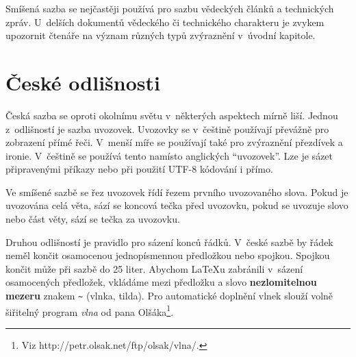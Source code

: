 \documentclass[a4paper, twocolumn, 11pt]{article}
\newcommand{\enuv}[1]{\textquotedblleft #1\textquotedblright}	%
\begin{document}
Smíšená sazba se nejčastěji používá pro sazbu vědeckých článků a technických zpráv. U~delších dokumentů vědeckého či technického charakteru je zvykem upozornit čtenáře na význam různých typů zvýraznění v~úvodní kapitole.

\section{České odlišnosti}

Česká sazba se oproti okolnímu světu v~některých aspektech mírně liší. Jednou z~odlišností je sazba uvozovek. Uvozovky se v~češtině používají převážně pro zobrazení přímé řeči. V~menší míře se používají také pro zvýraznění přezdívek a ironie. V~češtině se používá tento \textbf{} namísto anglických \enuv{uvozovek}. Lze je sázet připravenými příkazy nebo při použití UTF-8 kódování i přímo.

Ve smíšené sazbě se řez uvozovek řídí řezem prvního uvozovaného slova. Pokud je uvozována celá věta, sází se koncová tečka před uvozovku, pokud se uvozuje slovo nebo část věty, sází se tečka za uvozovku.

Druhou odlišností je pravidlo pro sázení konců řádků. V~české sazbě by řádek neměl končit osamocenou jednopísmennou předložkou nebo spojkou. Spojkou  končit může při sazbě do 25 liter. Abychom \LaTeX u zabránili v~sázení osamocených předložek, vkládáme mezi předložku a slovo \textbf{nezlomitelnou mezeru} znakem \verb|~| (vlnka, tilda). Pro automatické doplnění vlnek slouží volně šiřitelný program \textit{vlna} od pana Olšáka\footnote{Viz http://petr.olsak.net/ftp/olsak/vlna/.}.
\end{document}
